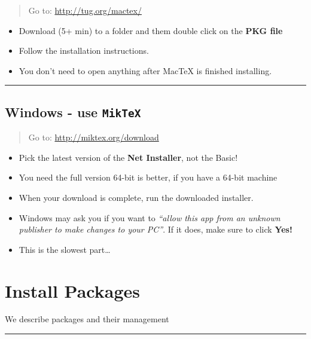 \documentclass[]{book}
\providecommand{\tightlist}{%
  \setlength{\itemsep}{0pt}\setlength{\parskip}{0pt}}
\theoremstyle{definition}
\theoremstyle{definition}
\theoremstyle{definition}
\theoremstyle{remark}
\begin{document}
\begin{quote}
Go to: \url{http://tug.org/mactex/}
\end{quote}

\begin{itemize}
\tightlist
\item
  Download (5+ min) to a folder and them double click on the \textbf{PKG
  file}
\item
  Follow the installation instructions.
\item
  You don't need to open anything after MacTeX is finished installing.
\end{itemize}

\begin{center}\rule{0.5\linewidth}{\linethickness}\end{center}

\section{\texorpdfstring{Windows - use
\texttt{MikTeX}}{Windows - use MikTeX}}\label{windows---use-miktex}

\begin{quote}
Go to: \url{http://miktex.org/download}
\end{quote}

\begin{itemize}
\tightlist
\item
  Pick the latest version of the \textbf{Net Installer}, not the Basic!
\item
  You need the full version 64-bit is better, if you have a 64-bit
  machine
\item
  When your download is complete, run the downloaded installer.
\item
  Windows may ask you if you want to \emph{``allow this app from an
  unknown publisher to make changes to your PC''}. If it does, make sure
  to click \textbf{Yes!}
\item
  This is the slowest part\ldots{}
\end{itemize}

\chapter{Install Packages}\label{install-packages}

We describe packages and their management

\begin{center}\rule{0.5\linewidth}{\linethickness}\end{center}
\end{document}

